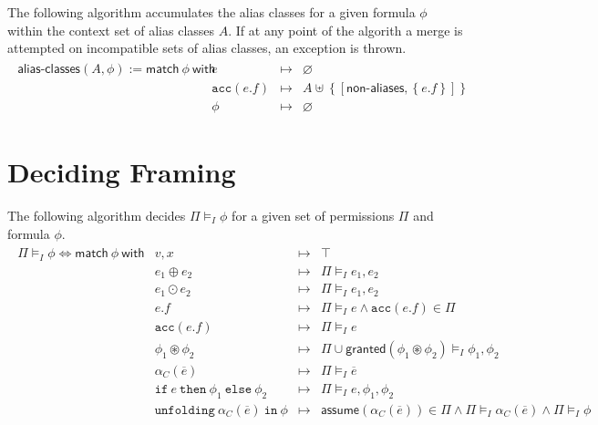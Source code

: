 \documentclass{article}
\newcommand{\tsf}{\textsf}
\newcommand{\ttt}{\texttt}
\newcommand{\assume}{\tsf{assume}}
\newcommand{\frames}{\vDash_I}
\newcommand{\mt}{\mapsto}
\newcommand{\set}[1]{\left\{ #1 \right\}}
\newcommand{\cast}{\circledast}
\renewcommand{\vec}{\overline}
\renewcommand{\empty}{\varnothing}
\newcommand{\cif}{\ttt{if}}
\newcommand{\cthen}{\ttt{then}}
\newcommand{\celse}{\ttt{else}}
\newcommand{\cacc}{\ttt{acc}}
\newcommand{\cunfolding}{\ttt{unfolding}}
\newcommand{\cin}{\ttt{in}}
\newcommand{\granted}{\tsf{granted}}
\newcommand{\nonaliases}{\tsf{non-aliases}}
\newcommand{\merge}{\uplus}
\begin{document}
\noindent
The following algorithm accumulates the alias classes for a given formula $\phi$ within the context set of alias classes $A$.
If at any point of the algorith a merge is attempted on incompatible sets of alias classes, an exception is thrown.
\begin{align*}
\begin{array}{r|lrl}
\tsf{alias-classes}(A, \phi)
:= \tsf{match} \ \phi \ \tsf{with}
%
%
& e                   &\mt& \empty
\\
%
& \cacc(e.f)          &\mt&  A \merge \set{ [\nonaliases, \set{e.f} ] }
\\
& \phi                &\mt& \empty
\end{array}
\end{align*}


\newpage
\section{Deciding Framing}

\noindent
The following algorithm decides $\Pi \frames \phi$ for a given set of permissions $\Pi$ and formula $\phi$.
\begin{align*}
\begin{array}{r|lrl}
\Pi \frames \phi
\iff \tsf{match} \ \phi \ \tsf{with}
%
%
& v, x                &\mt& \top
\\
& e_1 \oplus e_2      &\mt& \Pi \frames e_1, e_2
\\
& e_1 \odot e_2       &\mt& \Pi \frames e_1, e_2
\\
& e.f                 &\mt& \Pi \frames e
                      \land \cacc(e.f) \in \Pi
\\
%
& \cacc(e.f)          &\mt& \Pi \frames e
\\
& \phi_1 \cast \phi_2 &\mt& \Pi \cup \tsf{granted}(\phi_1 \cast \phi_2) \frames \phi_1, \phi_2
\\
& \alpha_C(\vec{e})   &\mt& \Pi \frames \vec{e}
\\
& \cif \ e \ \cthen \ \phi_1 \ \celse \ \phi_2
                      &\mt& \Pi \frames e, \phi_1, \phi_2
\\
& \cunfolding \ \alpha_C(\vec{e}) \ \cin \ \phi
                      &\mt& \assume(\alpha_C(\vec{e})) \in \Pi
                      \land \Pi \frames \alpha_C(\vec{e})
                      \land \Pi \frames \phi
\end{array}
\end{align*}
\end{document}
